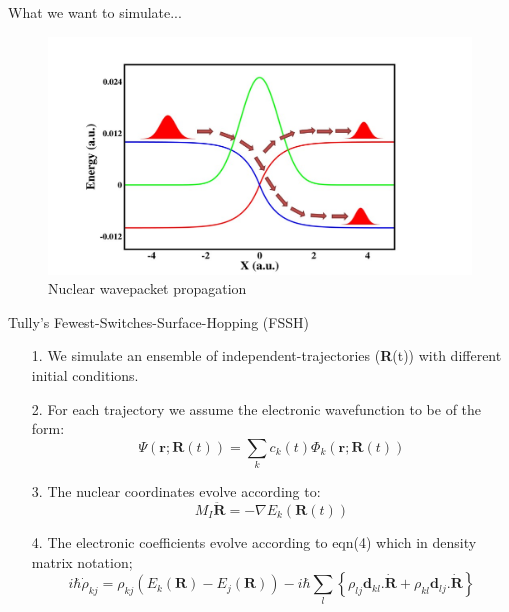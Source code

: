 \documentclass{beamer}
\begin{document}
	\begin{frame}[t]{What we want to simulate...}
	\begin{center}
	\begin{figure}
	\includegraphics[width=1.1\linewidth, height=0.6\linewidth]{nuclear_propagation.jpg}
	\caption{Nuclear wavepacket propagation}
	\end{figure}
	\end{center}
	\end{frame}
	

	\begin{frame}[t]{Tully's Fewest-Switches-Surface-Hopping (FSSH)}
	\begin{enumerate}
	\item[1.]{We simulate an ensemble of independent-trajectories (\textbf{R}(t)) with different initial conditions.}
	\item[2.]{For each trajectory we assume the electronic wavefunction to be of the form:
	\begin{equation}
	\Psi(\textbf{r};\textbf{R}(t)) = \sum_kc_k(t)\Phi_k(\textbf{r};\textbf{R}(t))
	\end{equation}}
	\item[3.]{The nuclear coordinates evolve according to:
	\begin{equation}
	M_I\ddot{\textbf{R}} = -\nabla E_k(\textbf{R}(t))
	\end{equation}}
	\item[4.]{The electronic coefficients evolve according to eqn(4) which in density matrix notation;
	\begin{equation}
	i\hbar\dot{\rho}_{kj} = \rho_{kj}(E_k(\textbf{R})-E_j(\textbf{R})) - i\hbar \sum_l\left\lbrace\rho_{lj}\textbf{d}_{kl}\textbf{.}\dot{\textbf{R}} + \rho_{kl}\textbf{d}_{lj}\textbf{.}\dot{\textbf{R}}\right\rbrace
	\end{equation}}
	\end{enumerate}
	\end{frame}
	
\end{document}
